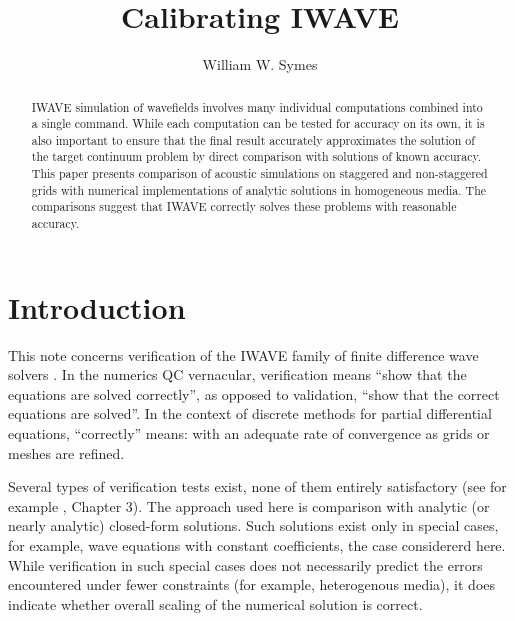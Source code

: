 \title{Calibrating IWAVE}
\date{}
\author{William W. Symes}



\maketitle
\parskip 12pt
\begin{abstract}
IWAVE simulation of wavefields involves many individual computations combined into a single command. While each computation can be tested for accuracy on its own, it is also important to ensure that the final result accurately approximates the solution of the target continuum problem by direct comparison with solutions of known accuracy. This paper presents comparison of acoustic simulations on staggered and non-staggered grids with numerical implementations of analytic solutions in homogeneous media. The comparisons suggest that IWAVE correctly solves these problems with reasonable accuracy.
\end{abstract}

\section{Introduction}
This note concerns verification of the IWAVE family of finite
difference wave solvers \cite[]{GeoPros:11}. In the numerics QC vernacular, verification
means ``show that the equations are solved correctly'', as opposed to
validation, ``show that the correct equations are solved''. In the
context of discrete methods for partial differential equations,
``correctly'' means: with an adequate rate of convergence as grids or
meshes are refined.

Several types of verification tests exist, none of
them entirely satisfactory (see for example \cite{FehlerKeliher:11},
Chapter 3). The approach used here is comparison with
analytic (or nearly analytic) closed-form solutions. Such solutions
exist only in special cases, for example, wave equations with constant
coefficients, the case considererd here. While verification in such
special cases does not necessarily predict the errors encountered
under fewer constraints (for example, heterogenous media), it does
indicate whether overall scaling of the numerical solution is correct.

